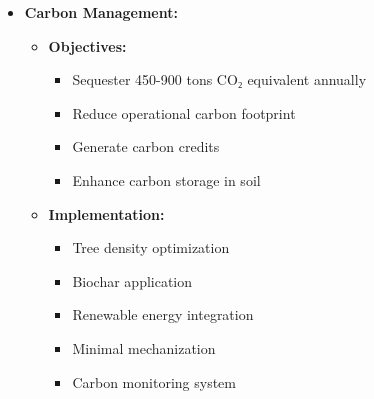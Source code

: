 \begin{itemize}
    \item \textbf{Carbon Management:}
    \begin{itemize}
        \item \textbf{Objectives:}
        \begin{itemize}
            \item Sequester 450-900 tons CO₂ equivalent annually
            \item Reduce operational carbon footprint
            \item Generate carbon credits
            \item Enhance carbon storage in soil
        \end{itemize}
        \item \textbf{Implementation:}
        \begin{itemize}
            \item Tree density optimization
            \item Biochar application
            \item Renewable energy integration
            \item Minimal mechanization
            \item Carbon monitoring system
        \end{itemize}
    \end{itemize}
\end{itemize}

